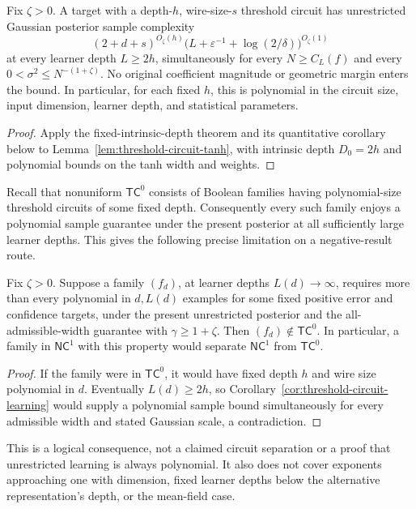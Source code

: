 \begin{corollary}
\label{cor:threshold-circuit-learning}
Fix $\zeta>0$. A target with a depth-$h$, wire-size-$s$ threshold circuit
has unrestricted Gaussian posterior sample complexity
\[
 (2+d+s)^{O_\zeta(h)}
 \bigl(L+\varepsilon^{-1}+\log(2/\delta)\bigr)^{O_\zeta(1)}
\]
at every learner depth $L\ge2h$, simultaneously for every
$N\ge C_L(f)$ and every $0<\sigma^2\le N^{-(1+\zeta)}$.
No original coefficient magnitude or geometric margin enters the bound.
In particular, for each fixed $h$, this is polynomial in the circuit
size, input dimension, learner depth, and statistical parameters.
\end{corollary}

\begin{proof}
Apply the fixed-intrinsic-depth theorem and its quantitative corollary
below to Lemma~\ref{lem:threshold-circuit-tanh}, with intrinsic depth
$D_0=2h$ and polynomial bounds on the tanh width and weights.
\end{proof}

Recall that nonuniform $\mathsf{TC}^0$ consists of Boolean families
having polynomial-size threshold circuits of some fixed depth.
Consequently every such family enjoys a polynomial sample guarantee
under the present posterior at all sufficiently large learner depths.
This gives the following precise limitation on a negative-result route.

\begin{corollary}
\label{cor:tc0-counterexample-barrier}
Fix $\zeta>0$. Suppose a family $(f_d)$, at learner depths $L(d)\to\infty$,
requires more than every polynomial in $d,L(d)$ examples for some fixed
positive error and confidence targets, under the present unrestricted
posterior and the all-admissible-width guarantee with
$\gamma\ge1+\zeta$. Then $(f_d)\notin\mathsf{TC}^0$.
In particular, a family in $\mathsf{NC}^1$ with this property would
separate $\mathsf{NC}^1$ from $\mathsf{TC}^0$.
\end{corollary}

\begin{proof}
If the family were in $\mathsf{TC}^0$, it would have fixed depth $h$
and wire size polynomial in $d$. Eventually $L(d)\ge2h$, so
Corollary~\ref{cor:threshold-circuit-learning} would supply a polynomial
sample bound simultaneously for every admissible width and stated
Gaussian scale, a contradiction.
\end{proof}

This is a logical consequence, not a claimed circuit separation or a
proof that unrestricted learning is always polynomial. It also does not
cover exponents approaching one with dimension, fixed learner depths
below the alternative representation's depth, or the mean-field case.
